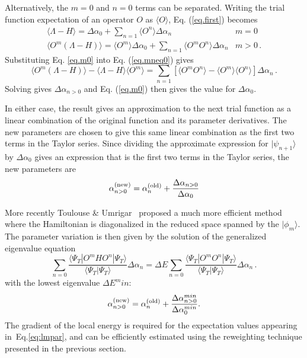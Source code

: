 Alternatively, the $m=0$ and $n=0$ terms can be separated. Writing
the trial function expectation of an operator $O$ as $\langle O\rangle$,
Eq. (\ref{eq.first}) becomes
\begin{eqnarray}
\label{eq.m0}
\langle \Lambda - H \rangle = \Delta \alpha_0 + \sum_{n=1} \langle O^n\rangle
\Delta \alpha_n & m=0\\
\label{eq.mneq0}
\langle O^m (\Lambda-H) \rangle = \langle O^m\rangle \Delta \alpha_0
+ \sum_{n=1} \langle O^m O^n\rangle \Delta \alpha_n & m > 0 \,.
\end{eqnarray}
Substituting Eq. \ref{eq.m0} into Eq. (\ref{eq.mneq0}) gives
\begin{equation}
\label{eq:srpar}
\langle O^m(\Lambda - H) \rangle -\langle \Lambda - H\rangle \langle O^m\rangle
= \sum_{n=1} \left [ \langle O^mO^n\rangle - \langle O^m\rangle
\langle O^n\rangle \right ] \Delta \alpha_n \,.
\end{equation}
Solving gives $\Delta \alpha_{n>0}$ and
Eq. (\ref{eq.m0}) then gives the value for $\Delta \alpha_0$.

In either case, the result gives an approximation to the next trial
function as a linear combination of the original function and its
parameter derivatives. The new parameters are chosen to give this
same linear combination as the first two terms in the Taylor series.
Since dividing the approximate expression for $|\psi_{n+1}\rangle$
by $\Delta\alpha_0$ gives
an expression that is the first two terms in the Taylor series,
the new parameters are
\begin{equation}
\alpha^{(\rm new)}_{n>0} =
\alpha^{(\rm old)}_n + \frac{\Delta \alpha_{n>0}}{\Delta \alpha_0}
\end{equation}


More recently Toulouse \& Umrigar~\cite{Toulouse07} proposed a much more efficient method
where the Hamiltonian is diagonalized in the reduced space spanned by the $|\phi_m\rangle$.
The parameter variation is then given by the solution of the generalized eigenvalue equation
\begin{equation}
\label{eq:lmpar}
\sum_{n=0}\frac{\langle \Psi_T |O^m H O^n|\Psi_T\rangle}
{\langle \Psi_T |\Psi_T\rangle}\Delta \alpha_n
= \Delta E \sum_{n=0} \frac{\langle \Psi_T |O^m O^n |\Psi_T\rangle}
{\langle \Psi_T |\Psi_T\rangle} \Delta \alpha_n\,.
\end{equation}
with the lowest eigenvalue $\Delta E^min$:
\begin{equation}
\alpha^{(\rm new)}_{n>0} =
\alpha^{(\rm old)}_n + \frac{\Delta \alpha^{min}_{n>0}}{\Delta \alpha^{min}_0} .
\end{equation}
The gradient of the local energy is required for the expectation values 
appearing in~Eq.\eqref{eq:lmpar}, and can be efficiently estimated using the
reweighting technique presented in the previous section.

